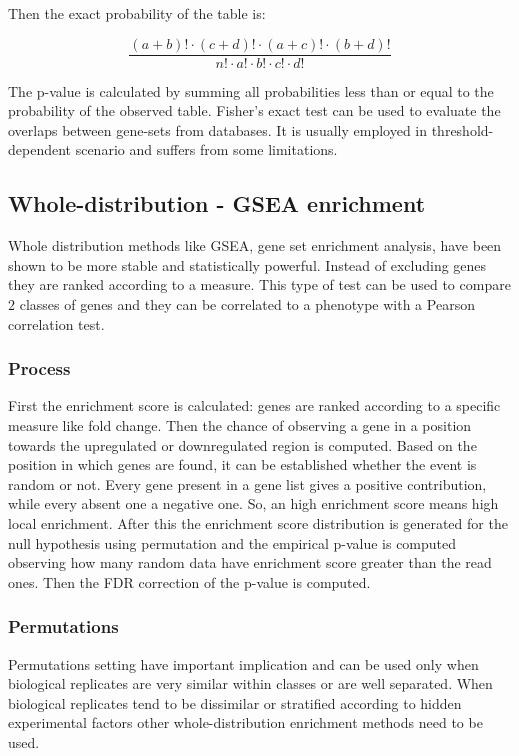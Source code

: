 		Then the exact probability of the table is:

		$$\frac{(a+b)!\cdot(c+d)!\cdot(a+c)!\cdot(b+d)!}{n!\cdot a!\cdot b!\cdot c!\cdot d!}$$

		The p-value is calculated by summing all probabilities less than or equal to the probability of the observed table.
		Fisher's exact test can be used to evaluate the overlaps between gene-sets from databases.
		It is usually employed in threshold-dependent scenario and suffers from some limitations.

	\subsection{Whole-distribution - GSEA enrichment}
	Whole distribution methods like GSEA, gene set enrichment analysis, have been shown to be more stable and statistically powerful.
	Instead of excluding genes they are ranked according to a measure.
	This type of test can be used to compare $2$ classes of genes and they can be correlated to a phenotype with a Pearson correlation test.

		\subsubsection{Process}
		First the enrichment score is calculated: genes are ranked according to a specific measure like fold change.
		Then the chance of observing a gene in a position towards the upregulated or downregulated region is computed.
		Based on the position in which genes are found, it can be established whether the event is random or not.
		Every gene present in a gene list gives a positive contribution, while every absent one a negative one.
		So, an high enrichment score means high local enrichment.
		After this the enrichment score distribution is generated for the null hypothesis using permutation and the empirical p-value is computed observing how many random data have enrichment score greater than the read ones.
		Then the FDR correction of the p-value is computed.

		\subsubsection{Permutations}
		Permutations setting have important implication and can be used only when biological replicates are very similar within classes or are well separated.
		When biological replicates tend to be dissimilar or stratified according to hidden experimental factors other whole-distribution enrichment methods need to be used.

